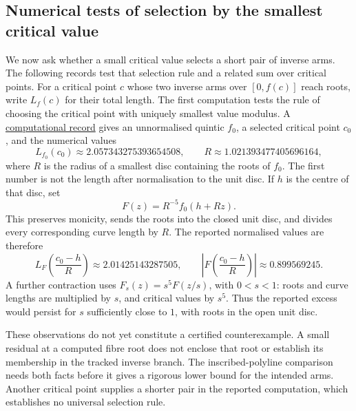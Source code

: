 \subsection*{Numerical tests of selection by the smallest critical value}

We now ask whether a small critical value selects a short pair of
inverse arms. The following records test that selection rule and a
related sum over critical points. For a critical point $c$ whose two
inverse arms over $[0,f(c)]$ reach roots, write $L_f(c)$ for their total
length.
The first computation tests the rule of choosing the critical point
with uniquely smallest value modulus. A
\href{https://github.com/wcook04/plectis-erdos/blob/f214a6b45528dc5eefe20ffadc35f2e981627d4c/research_corpus/Erdos1041/MinimalHubArmBudgetRefutation.md}{computational record}
gives an unnormalised
quintic $f_0$, a selected critical point $c_0$, and the numerical values
\[
 L_{f_0}(c_0)\approx2.057343275393654508,
 \qquad R\approx1.021393477405696164,
\]
where $R$ is the radius of a smallest disc containing the roots of $f_0$.
The first number is not the length after normalisation to the unit disc.
If $h$ is the centre of that disc, set
\[
 F(z)=R^{-5}f_0(h+Rz).
\]
This preserves monicity, sends the roots into the closed unit disc,
and divides every corresponding curve length by $R$. The reported
normalised values are therefore
\[
 L_F\!\left(\frac{c_0-h}{R}\right)\approx2.01425143287505,
 \qquad
 \left|F\!\left(\frac{c_0-h}{R}\right)\right|
 \approx0.899569245.
\]
A further contraction uses $F_s(z)=s^5F(z/s)$, with $0<s<1$: roots and
curve lengths are multiplied by $s$, and critical values by $s^5$.
Thus the reported excess would persist for $s$ sufficiently close to $1$,
with roots in the open unit disc.

These observations do not yet constitute a certified counterexample. A small
residual at a computed fibre root does not enclose that root or establish
its membership in the tracked inverse branch. The inscribed-polyline
comparison needs both facts before it gives a rigorous lower bound for
the intended arms. Another critical point supplies a shorter pair in the reported
computation, which establishes no universal selection rule.

